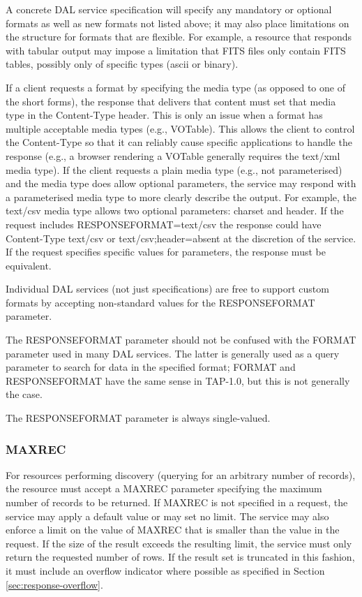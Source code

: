 \documentclass[11pt,letter]{ivoa}
\begin{document}
A concrete DAL service specification will specify any mandatory or optional
formats as well as new formats not listed above; it may also place limitations
on the structure for formats that are flexible.  For example, a resource that
responds with tabular output may impose a limitation that FITS files only
contain FITS tables, possibly only of specific types (ascii or binary).

If a client requests a format by specifying the media type (as opposed to one of
the short forms), the response that delivers that content must set that
media type
in the Content-Type header. This is only an issue when a format has multiple
acceptable media types (e.g., VOTable). This allows the client to control the
Content-Type so that it can reliably cause specific applications to handle the
response (e.g., a browser rendering a VOTable generally requires the text/xml
media type). If the client requests a plain media type (e.g., not parameterised) and
the media type does allow optional parameters, the service may respond with a
parameterised media type to more clearly describe the output. For example, the
text/csv media type allows two optional parameters: charset and header. If the
request includes RESPONSEFORMAT=text/csv the response could have Content-Type
text/csv or text/csv;header=absent at the discretion of the service. If the
request specifies specific values for parameters, the response must be
equivalent.

Individual DAL services (not just specifications) are free to support custom
formats by accepting non-standard values for the RESPONSEFORMAT parameter.

The RESPONSEFORMAT parameter should not be confused with the FORMAT parameter
used in many DAL services. The latter is generally used as a query parameter to
search for data in the specified format; FORMAT and RESPONSEFORMAT have the same
sense in TAP-1.0, but this is not generally the case.

The RESPONSEFORMAT parameter is always single-valued.

\subsubsection{MAXREC}
\label{sec:MAXREC}
For resources performing discovery (querying for an arbitrary number of
records), the resource must accept a MAXREC parameter specifying the maximum
number of records to be returned. If MAXREC is not specified in a request, the
service may apply a default value or may set no limit. The service may also
enforce a limit on the value of MAXREC that is smaller than the value in the
request. If the size of the result exceeds the resulting limit, the service must
only return the requested number of rows. If the result set is truncated in this
fashion, it must include an overflow indicator where possible as specified in Section \ref{sec:response-overflow}.
\end{document}
